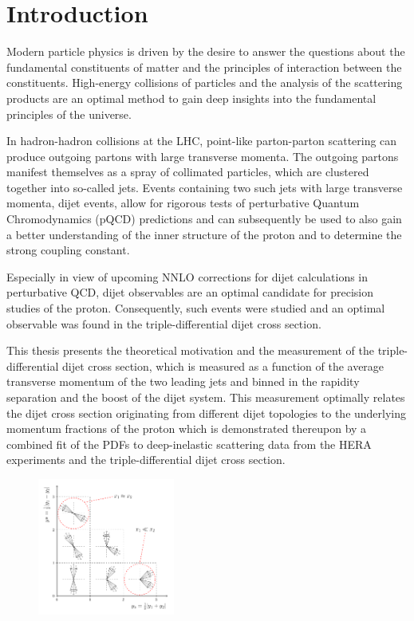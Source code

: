 
\chapter{Introduction}

Modern particle physics is driven by the desire to answer the questions about the
fundamental constituents of matter and the principles of interaction between the
constituents. High-energy collisions of particles and the analysis of the
scattering products are an optimal method to gain deep insights into the
fundamental principles of the universe. 

In hadron-hadron collisions at the LHC, point-like parton-parton scattering can
produce outgoing partons with large transverse momenta. The outgoing partons
manifest themselves as a spray of collimated particles, which are clustered
together into so-called jets. Events containing two such jets with large
transverse momenta, dijet events, allow for rigorous tests of
perturbative Quantum Chromodynamics (pQCD) predictions and can subsequently be
used to also gain a better understanding of the inner structure of the proton
and to determine the strong coupling constant.

Especially in view of upcoming NNLO corrections for dijet calculations in
perturbative QCD, dijet observables are an optimal candidate for precision
studies of the proton. Consequently, such events were studied and an
optimal observable was found in the triple-differential dijet cross section.

This thesis presents the theoretical motivation and the measurement of the
triple-differential dijet cross section, which is measured as a function of the
average transverse momentum of the two leading jets and binned in the rapidity
separation and the boost of the dijet system. This measurement optimally relates
the dijet cross section originating from different dijet topologies to the
underlying momentum fractions of the proton which is demonstrated thereupon by a
combined fit of the PDFs to deep-inelastic scattering data from the HERA
experiments and the triple-differential dijet cross section.

\begin{figure}[h!tb]
    \centering
    \includegraphics[width=0.4\textwidth]{figures/drawings/ybys_hint.pdf}
\end{figure}

